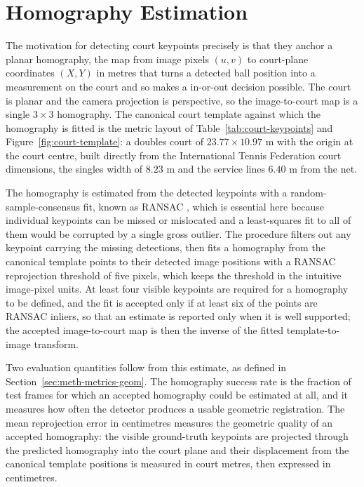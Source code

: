 \section{Homography Estimation}
\label{sec:court-homography}

The motivation for detecting court keypoints precisely is that they anchor a
planar homography, the map from image pixels $(u, v)$ to court-plane coordinates
$(X, Y)$ in metres that turns a detected ball position into a measurement on the
court and so makes a in-or-out decision possible. The court is planar
and the camera projection is perspective, so the image-to-court map is a single
$3 \times 3$ homography. The canonical court template against which the homography
is fitted is the metric layout of Table~\ref{tab:court-keypoints} and
Figure~\ref{fig:court-template}: a doubles court of $23.77 \times 10.97$ m with
the origin at the court centre, built directly from the International Tennis
Federation court dimensions, the singles width of $8.23$ m and the service lines
$6.40$ m from the net.

The homography is estimated from the detected keypoints with a
random-sample-consensus fit, known as RANSAC \cite{fischler1981ransac}, which is essential here
because individual keypoints can be missed or mislocated and a least-squares fit
to all of them would be corrupted by a single gross outlier. The procedure
filters out any keypoint carrying the missing detections, then fits a homography
from the canonical template points to their detected image positions with a RANSAC
reprojection threshold of five pixels, which keeps the threshold in the intuitive
image-pixel units. At least four visible keypoints are required for a homography
to be defined, and the fit is accepted only if at least six of the points are
RANSAC inliers, so that an estimate is reported only when it is well supported;
the accepted image-to-court map is then the inverse of the fitted template-to-image
transform.

Two evaluation quantities follow from this estimate, as defined in
Section~\ref{sec:meth-metrics-geom}. The homography success rate is the fraction
of test frames for which an accepted homography could be estimated at all, and it
measures how often the detector produces a usable geometric registration. The
mean reprojection error in centimetres measures the geometric quality of an
accepted homography: the visible ground-truth keypoints are projected through the
predicted homography into the court plane and their displacement from the
canonical template positions is measured in court metres, then expressed in
centimetres.

